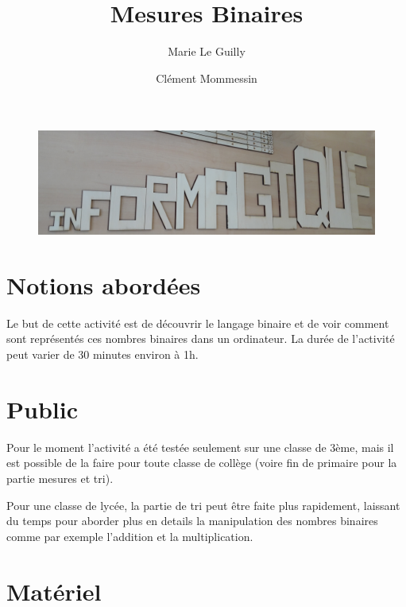\documentclass[a4paper,12pt]{scrartcl}
\begin{document}
\title{Mesures Binaires}
\author{Marie Le Guilly \and Clément Mommessin}

\maketitle

\begin{figure}[h]
\begin{center}
\includegraphics[width=0.7\linewidth]{images/informagique.jpg} 
\end{center}
\end{figure}

\section{Notions abordées}

Le but de cette activité est de découvrir le langage binaire et de voir comment sont représentés ces nombres binaires dans un ordinateur.
La durée de l'activité peut varier de 30 minutes environ à 1h.


\section{Public}

Pour le moment l'activité a été testée seulement sur une classe de 3ème, mais il est possible de la faire pour toute classe de collège (voire fin de primaire pour la partie mesures et tri).

Pour une classe de lycée, la partie de tri peut être faite plus rapidement, laissant du temps pour aborder plus en details la manipulation des nombres binaires comme par exemple l'addition et la multiplication.



\section{Matériel}
\end{document}
